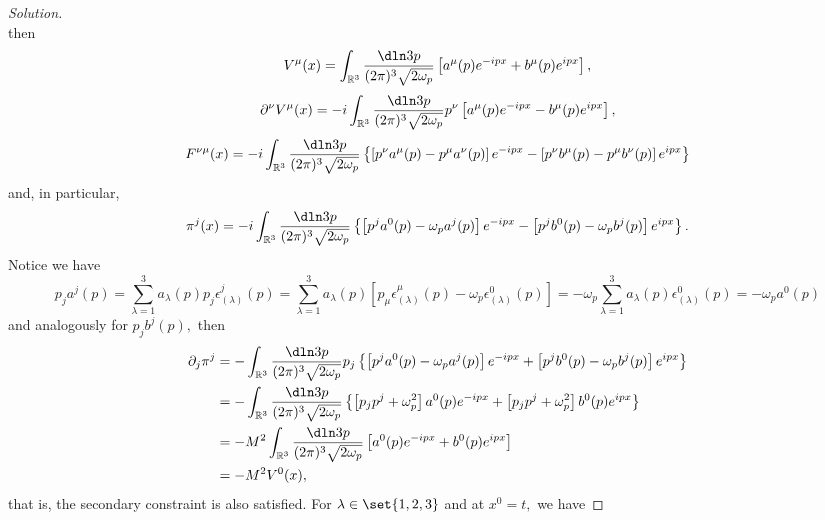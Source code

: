 \begin{proof}[Solution]
\begin{equation*}
   \end{equation*}
   then
   \begin{equation*}
      V^{\mu}(x) = \int_{\mathbb{R}^3} \frac{\dln3p}{(2\pi)^3 \sqrt{2 \omega_p}} \left[a^\mu(p) e^{-ipx} + b^{\mu}(p) e^{ipx}\right],
   \end{equation*}
   \begin{equation*}
      \partial^\nu V^{\mu}(x) = -i\int_{\mathbb{R}^3} \frac{\dln3p}{(2\pi)^3 \sqrt{2 \omega_p}} p^\nu\left[a^\mu(p) e^{-ipx} - b^{\mu}(p) e^{ipx}\right],
   \end{equation*}
   \begin{equation*}
      F^{\nu\mu}(x) = -i\int_{\mathbb{R}^3} \frac{\dln3p}{(2\pi)^3 \sqrt{2 \omega_p}} \left\{\left[p^\nu a^\mu(p) - p^\mu a^\nu(p)\right] e^{-ipx} - \left[p^\nu b^{\mu}(p) - p^\mu b^\nu(p)\right] e^{ipx}\right\}
   \end{equation*}
   and, in particular,
   \begin{equation*}
      \pi^j(x) = -i\int_{\mathbb{R}^3} \frac{\dln3p}{(2\pi)^3 \sqrt{2 \omega_p}} \left\{\left[p^j a^0(p) - \omega_p a^j(p)\right] e^{-ipx} - \left[p^j b^{0}(p) - \omega_p b^j(p)\right] e^{ipx}\right\}.
   \end{equation*}
   Notice we have
   \begin{equation*}
      p_j a^j(p) = \sum_{\lambda = 1}^3 a_\lambda(p) p_j \epsilon_{(\lambda)}^j(p) = \sum_{\lambda = 1}^3 a_{\lambda}(p) \left[p_\mu \epsilon^\mu_{(\lambda)}(p) - \omega_p \epsilon^0_{(\lambda)}(p)\right] = - \omega_p \sum_{\lambda = 1}^3 a_{\lambda}(p) \epsilon^{0}_{(\lambda)}(p) = -\omega_p a^0(p)
   \end{equation*}
   and analogously for \(p_j b^j(p),\) then
   \begin{align*}
      \partial_j \pi^j &= -\int_{\mathbb{R}^3} \frac{\dln3p}{(2\pi)^3 \sqrt{2 \omega_p}} p_j\left\{\left[p^j a^0(p) - \omega_p a^j(p)\right] e^{-ipx} + \left[p^j b^{0}(p) - \omega_p b^j(p)\right] e^{ipx}\right\}\\
                       &= -\int_{\mathbb{R}^3} \frac{\dln3p}{(2\pi)^3 \sqrt{2 \omega_p}} \left\{\left[p_j p^j + \omega_p^2\right]a^0(p) e^{-ipx} + \left[p_j p^j + \omega_p^2\right]b^0(p) e^{ipx}\right\}\\
                       &=  -M^2 \int_{\mathbb{R}^3}\frac{\dln3p}{(2\pi)^3 \sqrt{2 \omega_p}} \left[a^0(p) e^{-ipx} + b^0 (p)e^{ipx}\right]\\
                       &= -M^2 V^0(x),
   \end{align*}
   that is, the secondary constraint is also satisfied. For \(\lambda \in \set{1,2,3}\) and at \(x^0 = t,\) we have

\end{proof}
